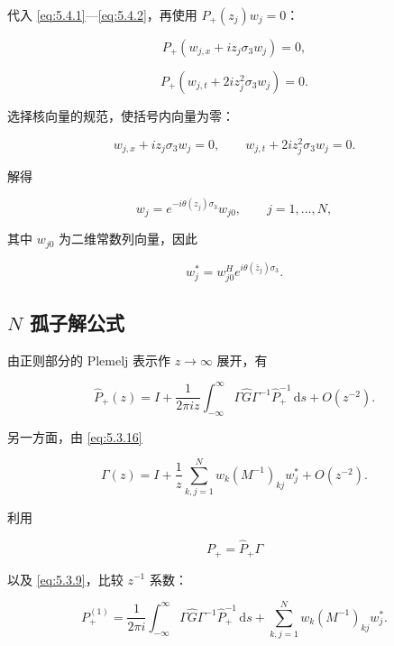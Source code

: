 \documentclass[
    lang=cn,
    scheme=chinese,
    mode=simple,
    device=normal,
    color=blue,
    math=cm,
    thmcnt=section,
    12pt
]{elegantbook}
\begin{document}
代入 \eqref{eq:5.4.1}---\eqref{eq:5.4.2}，再使用 $P_+(z_j)w_j=0$：

\[
    P_+\left(w_{j,x}+iz_j\sigma_3w_j\right)=0,
\]

\[
    P_+\left(w_{j,t}+2iz_j^2\sigma_3w_j\right)=0.
\]

选择核向量的规范，使括号内向量为零：

\[
    w_{j,x}+iz_j\sigma_3w_j=0,
    \qquad
    w_{j,t}+2iz_j^2\sigma_3w_j=0.
\]

解得

\begin{equation}
    w_j
    =
    e^{-i\theta(z_j)\sigma_3}w_{j0},
    \qquad
    j=1,\ldots,N,
    \tag{5.4.5}
    \label{eq:5.4.5}
\end{equation}

其中 $w_{j0}$ 为二维常数列向量，因此

\begin{equation}
    w_j^*
    =
    w_{j0}^He^{i\theta(\bar z_j)\sigma_3}.
    \tag{5.4.6}
    \label{eq:5.4.6}
\end{equation}

\subsection{\texorpdfstring{$N$}{N} 孤子解公式}

由正则部分的 Plemelj 表示作 $z\to\infty$ 展开，有

\begin{equation}
    \widehat P_+(z)
    =
    I+
    \dfrac{1}{2\pi iz}
    \int_{-\infty}^{\infty}
    \Gamma\widehat G\Gamma^{-1}\widehat P_+^{-1}\,\mathrm ds
    +
    O(z^{-2}).
    \tag{5.4.7}
    \label{eq:5.4.7}
\end{equation}

另一方面，由 \eqref{eq:5.3.16}

\begin{equation}
    \Gamma(z)
    =
    I+
    \dfrac{1}{z}
    \sum\limits_{k,j=1}^{N}
    w_k(M^{-1})_{kj}w_j^*
    +
    O(z^{-2}).
    \tag{5.4.8}
    \label{eq:5.4.8}
\end{equation}

利用

\[
    P_+=\widehat P_+\Gamma
\]

以及 \eqref{eq:5.3.9}，比较 $z^{-1}$ 系数：

\begin{equation}
    P_+^{(1)}
    =
    \dfrac{1}{2\pi i}
    \int_{-\infty}^{\infty}
    \Gamma\widehat G\Gamma^{-1}\widehat P_+^{-1}\,\mathrm ds
    +
    \sum\limits_{k,j=1}^{N}
    w_k(M^{-1})_{kj}w_j^*.
    \tag{5.4.9}
    \label{eq:5.4.9}
\end{equation}
\end{document}
